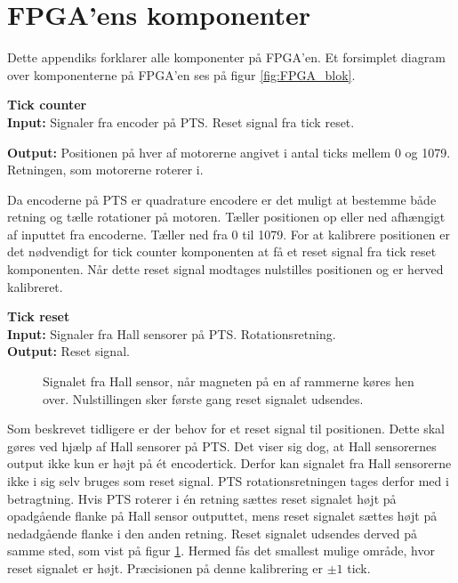 \section{FPGA'ens komponenter}
\label{sec:fpgaappendix}
Dette appendiks forklarer alle komponenter på FPGA'en.
Et forsimplet diagram over komponenterne på FPGA'en ses på figur \ref{fig:FPGA_blok}.


\textbf{Tick counter}\\
\textbf{Input:}
Signaler fra encoder på PTS. Reset signal fra tick reset.

\textbf{Output:} Positionen på hver af motorerne angivet i antal ticks mellem 0 
og 1079. Retningen, som motorerne roterer i. 

Da encoderne på PTS er quadrature encodere er det muligt at bestemme både retning og 
tælle rotationer på motoren.
Tæller positionen op eller ned afhængigt af inputtet fra encoderne. 
Tæller ned fra 0 til 1079.
For at kalibrere positionen er det nødvendigt for tick counter komponenten at få 
et reset signal fra tick reset komponenten. 
Når dette reset signal modtages nulstilles positionen og er herved kalibreret.

\textbf{Tick reset}\\
\textbf{Input:} Signaler fra Hall sensorer på PTS. Rotationsretning.\\
\textbf{Output:} Reset signal.

\begin{figure}[!th]
\centering

\caption[Signal fra Hall sensor]{Signalet fra Hall sensor, når magneten på en af rammerne køres hen over. Nulstillingen sker første gang reset signalet udsendes.}
\label{fig:hall_sensor_signal}
\end{figure}

Som beskrevet tidligere er der behov for et reset signal til positionen. 
Dette skal gøres ved hjælp af Hall sensorer på PTS. 
Det viser sig dog, at Hall sensorernes output ikke kun er højt på ét encodertick. 
Derfor kan signalet fra Hall sensorerne ikke i sig selv bruges som reset signal.
PTS rotationsretningen tages derfor med i betragtning.
Hvis PTS roterer i én retning sættes reset signalet højt på opadgående 
flanke på Hall sensor outputtet, mens reset signalet sættes højt på nedadgående 
flanke i den anden retning. Reset signalet udsendes derved på samme sted, som vist på figur \ref{fig:hall_sensor_signal}.
Hermed fås det smallest mulige område, hvor reset signalet er højt.
Præcisionen på denne kalibrering er \(\pm1\) tick.


